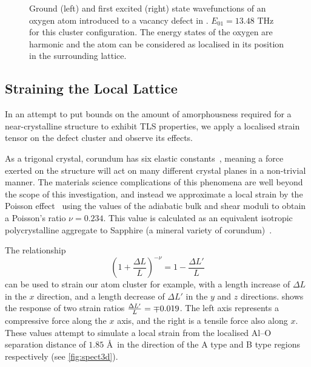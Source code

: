 \begin{figure}[htp]
\resizebox{0.5\textwidth}{!}{}
\caption[Oxygen Recovering Crystalline Position]{\label{fig:clustrecover}Ground (left) and first excited (right) state wavefunctions of an oxygen atom introduced to a vacancy defect in . $E_{01} = 13.48$ THz for this cluster configuration. The energy states of the oxygen are harmonic and the atom can be considered as localised in its position in the surrounding lattice.}
\end{figure}

\subsection{Straining the Local Lattice}

In an attempt to put bounds on the amount of amorphousness required for a near-crystalline structure to exhibit TLS properties, we apply a localised strain tensor on the defect cluster and observe its effects.

As a trigonal crystal, corundum has six elastic constants~\cite{Bass1995}, meaning a force exerted on the structure will act on many different crystal planes in a non-trivial manner.
The materials science complications of this phenomena are well beyond the scope of this investigation, and instead we approximate a local strain by the Poisson effect~\cite{Poisson1829} using the values of the adiabatic bulk and shear moduli to obtain a Poisson's ratio $\nu = 0.234$.
This value is calculated as an equivalent isotropic polycrystalline aggregate to Sapphire (a mineral variety of corundum)~\cite{Gercek2007}.

The relationship
\begin{equation}
\left(1+\frac{\Delta L}{L}\right)^{-\nu} = 1-\frac{\Delta L'}{L}
\label{eq:strain}
\end{equation}
can be used to strain our atom cluster for example, with a length increase of $\Delta L$ in the $x$ direction, and a length decrease of $\Delta L'$ in the $y$ and $z$ directions.
 shows the response of two strain ratios $\cramped{\frac{\Delta L'}{L}} = \mp 0.019$.
The left axis represents a compressive force along the $x$ axis, and the right is a tensile force also along $x$.
These values attempt to simulate a local strain from the localised Al--O separation distance of $1.85$ \AA\ in the direction of the A type and B type regions respectively (see \cref{fig:spect3d}).

